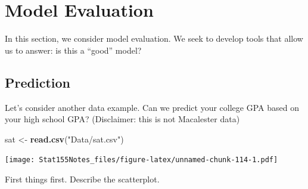 \documentclass[]{book}
\newenvironment{Shaded}{\begin{snugshade}}{\end{snugshade}}
\newcommand{\DataTypeTok}[1]{\textcolor[rgb]{0.13,0.29,0.53}{#1}}
\newcommand{\KeywordTok}[1]{\textcolor[rgb]{0.13,0.29,0.53}{\textbf{#1}}}
\newcommand{\NormalTok}[1]{#1}
\newcommand{\OperatorTok}[1]{\textcolor[rgb]{0.81,0.36,0.00}{\textbf{#1}}}
\newcommand{\OtherTok}[1]{\textcolor[rgb]{0.56,0.35,0.01}{#1}}
\newcommand{\StringTok}[1]{\textcolor[rgb]{0.31,0.60,0.02}{#1}}
\begin{document}
\hypertarget{model-evaluation}{%
\section{Model Evaluation}\label{model-evaluation}}

In this section, we consider model evaluation. We seek to develop tools that allow us to answer: is this a ``good'' model?

\hypertarget{prediction}{%
\subsection{Prediction}\label{prediction}}

Let's consider another data example. Can we predict your college GPA based on your high school GPA? (Disclaimer: this is not Macalester data)

\begin{Shaded}
\begin{Highlighting}[]
\NormalTok{sat <-}\StringTok{ }\KeywordTok{read.csv}\NormalTok{(}\StringTok{"Data/sat.csv"}\NormalTok{)}
\end{Highlighting}
\end{Shaded}

\begin{Shaded}
\end{Shaded}

\texttt{[image: Stat155Notes\_files/figure-latex/unnamed-chunk-114-1.pdf]}

First things first. Describe the scatterplot.
\end{document}
